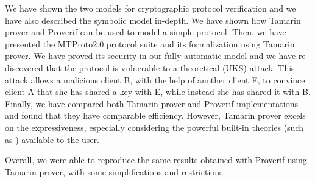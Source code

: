 We have shown the two models for cryptographic protocol verification and we have also described the symbolic model in-depth. We have shown how Tamarin prover and Proverif can be used to model a simple protocol. Then, we have presented the MTProto2.0 protocol suite and its formalization using Tamarin prover. We have proved its security in our fully automatic model and we have re-discovered that the protocol is vulnerable to a theoretical \uks{} (UKS) attack. This attack allows a malicious client B, with the help of another client E, to convince client A that she has shared a key with E, while instead she has shared it with B. Finally, we have compared both Tamarin prover and Proverif implementations and found that they have comparable efficiency. However, Tamarin prover excels on the expressiveness, especially considering the powerful built-in theories (such as \DiHe{}) available to the user.

Overall, we were able to reproduce the same results obtained with Proverif using Tamarin prover, with some simplifications and restrictions.